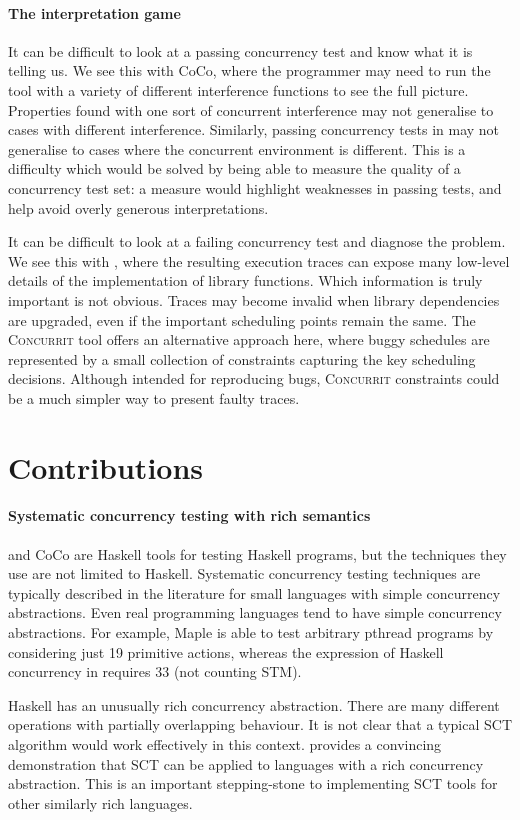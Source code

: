 \paragraph{The interpretation game}
It can be difficult to look at a passing concurrency test and know
what it is telling us.  We see this with CoCo, where the programmer
may need to run the tool with a variety of different interference
functions to see the full picture.  Properties found with one sort of
concurrent interference may not generalise to cases with different
interference.  Similarly, passing concurrency tests in \dejafu{} may
not generalise to cases where the concurrent environment is different.
This is a difficulty which would be solved by being able to measure
the quality of a concurrency test set: a measure would highlight
weaknesses in passing tests, and help avoid overly generous
interpretations.

It can be difficult to look at a failing concurrency test and diagnose
the problem.  We see this with \dejafu{}, where the resulting
execution traces can expose many low-level details of the
implementation of library functions.  Which information is truly
important is not obvious.  Traces may become invalid when library
dependencies are upgraded, even if the important scheduling points
remain the same.  The \textsc{Concurrit}\cite{elmas2013} tool offers
an alternative approach here, where buggy schedules are represented by
a small collection of constraints capturing the key scheduling
decisions.  Although intended for reproducing bugs, \textsc{Concurrit}
constraints could be a much simpler way to present faulty traces.

\section{Contributions}
\label{sec:conclusions-contributions}

\paragraph{Systematic concurrency testing with rich semantics}
\dejafu{} and CoCo are Haskell tools for testing Haskell programs, but
the techniques they use are not limited to Haskell.  Systematic
concurrency testing techniques are typically described in the
literature for small languages with simple concurrency abstractions.
Even real programming languages tend to have simple concurrency
abstractions.  For example, Maple\cite{yu2012} is able to test
arbitrary pthread programs by considering just 19 primitive actions,
whereas the expression of Haskell concurrency in \dejafu{} requires 33
(not counting STM).

Haskell has an unusually rich concurrency abstraction.  There are many
different operations with partially overlapping behaviour.  It is not
clear that a typical SCT algorithm would work effectively in this
context.  \dejafu{} provides a convincing demonstration that SCT can
be applied to languages with a rich concurrency abstraction.  This is
an important stepping-stone to implementing SCT tools for other
similarly rich languages.
